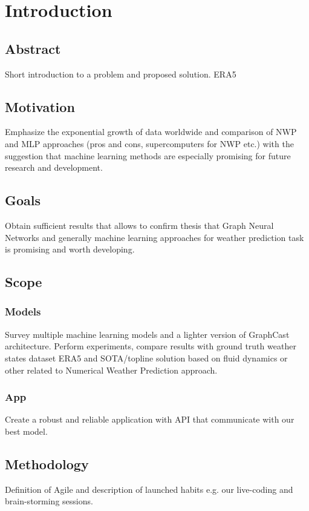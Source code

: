 
\chapter{Introduction}

\section{Abstract}
Short introduction to a problem and proposed solution. ERA5 

\section{Motivation}
Emphasize the exponential growth of data worldwide and comparison of NWP and MLP approaches (pros and cons, supercomputers for NWP etc.) with the suggestion that machine learning methods are especially promising for future research and development.

\section{Goals}
Obtain sufficient results that allows to confirm thesis that Graph Neural Networks and generally machine learning approaches for weather prediction task is promising and worth developing.

\section{Scope}

\subsection{Models}
Survey multiple machine learning models and a lighter version of GraphCast architecture. Perform experiments, compare results with ground truth weather states dataset ERA5 and SOTA/topline solution based on fluid dynamics or other related to Numerical Weather Prediction approach.

\subsection{App}
Create a robust and reliable application with API that communicate with our best model.

\section{Methodology}
Definition of Agile and description of launched habits e.g. our live-coding and brain-storming sessions. 

